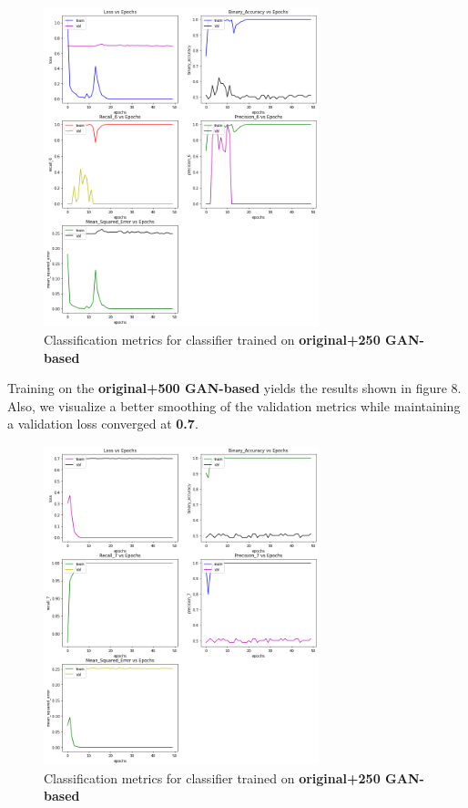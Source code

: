 \documentclass[conference]{IEEEtran}
\begin{document}
\begin{figure}[htbp]
\centerline{\includegraphics[width=80mm]{plot_250.png}}
\caption{Classification metrics for classifier trained on \textbf{original+250 GAN-based}}
\label{fig}
\end{figure}

Training on the \textbf{original+500 GAN-based} yields the results shown in figure 8. Also, we visualize a better smoothing of the validation metrics while maintaining a validation loss converged at \textbf{0.7}.

\begin{figure}[htbp]
\centerline{\includegraphics[width=80mm]{plot_500.png}}
\caption{Classification metrics for classifier trained on \textbf{original+250 GAN-based}}
\label{fig}
\end{figure}
\end{document}
